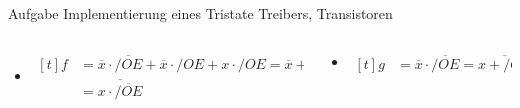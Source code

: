 \begin{frame}[allowframebreaks]{Aufgabe \thesection}{Implementierung eines Tristate Treibers, Transistoren}
\begin{solution}
        \begin{columns}
          \begin{column}[t]{0.5\textwidth}
            \begin{itemize}
              \item $\begin{aligned}[t]
                  f &= \overline{x} \cdot \overline{/OE} + \overline{x} \cdot /OE + x \cdot /OE = \overline{x} + /OE\\
                    &= \overline{x \cdot \overline{ /OE}} \end{aligned}$
            \end{itemize}
          \end{column}
          \begin{column}[t]{0.5\textwidth}
            \begin{itemize}
              \item $\begin{aligned}[t]
                  g &= \overline{x} \cdot \overline{/OE} = \overline{x + /OE} \end{aligned}$
            \end{itemize}
          \end{column}
        \end{columns}
      \end{solution}
    \end{frame}


